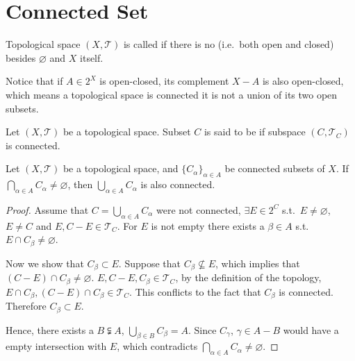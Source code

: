 \documentclass[openany]{book}
\begin{document}
\section{Connected Set}

\begin{definition}\label{definition: connected space}
	Topological space $(X, \mathscr T)$ is called %
	if there is no  (i.e.\ both open and closed) besides $\varnothing$ and $X$ itself. 
\end{definition}

Notice that if $A \in 2^X$ is open-closed, its complement $X - A$ is also open-closed, which means a topological space is connected  it is not a union of its two open subsets. 

\begin{definition}\label{definition: connected set}
	Let $(X, \mathscr T)$ be a topological space. 
	Subset $C$ is said to be %
	if subspace $(C, \mathscr T_C)$ is connected. 
\end{definition}

\begin{theorem}\label{theorem: union of connected sets}
	Let $(X, \mathscr T)$ be a topological space, and $\{C_\alpha\}_{\alpha \in A}$ be connected subsets of $X$. 
	If $\bigcap_{ \alpha \in A} C_\alpha \neq \varnothing$, then $\bigcup\limits_{\alpha \in A} C_\alpha$ is also connected. 
\end{theorem}
\begin{proof}
	Assume that $C = \bigcup_{\alpha \in A} C_\alpha$ were not connected, $\exists E \in 2^C$ s.t.\ $E \neq \varnothing$, $E \neq C$ and $E, C - E \in \mathscr T_C$. 
	For $E$ is not empty there exists a $\beta \in A$ s.t.\ $E \cap C_\beta \neq \varnothing$. 
	
	Now we show that $C_\beta \subset  E$.
	Suppose that $C_\beta \nsubseteq  E$, which implies that $(C - E) \cap C_\beta \neq \varnothing$. 
	$E, C - E, C_\beta \in \mathscr T_C$, by the definition of the topology, 
	$E \cap C_\beta, (C - E) \cap C_\beta \in \mathscr T_C$. 
	This conflicts to the fact that $C_\beta$ is connected. 
	Therefore $C_\beta \subset  E$. 

	Hence, there exists a $B \subsetneqq A$, $\bigcup_{ \beta \in B} C_\beta = A$. 
	Since $C_\gamma$, $\gamma \in A - B$ would have a empty intersection with $E$, which contradicts $\bigcap_{ \alpha \in A} C_\alpha \neq \varnothing$.
\end{proof}
\end{document}
